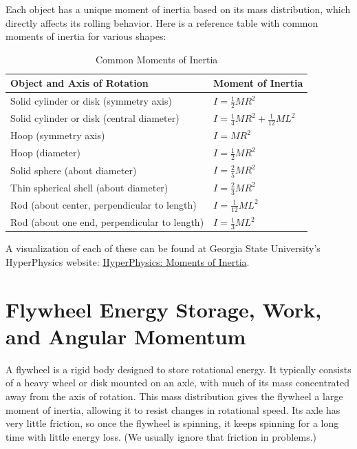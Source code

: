Each object has a unique moment of inertia based on its mass distribution, which directly affects its rolling behavior. Here is a reference table with common moments of inertia for various shapes:
\begin{table}[H]
  \centering
  \renewcommand{\arraystretch}{1.5}
  \begin{tabular}{|l|l|}
    \hline
    \textbf{Object and Axis of Rotation} & \textbf{Moment of Inertia} \\
    \hline
    Solid cylinder or disk (symmetry axis) & $I = \tfrac{1}{2}MR^2$ \\
    \hline
    Solid cylinder or disk (central diameter) & $I = \tfrac{1}{4}MR^2 + \tfrac{1}{12}ML^2$ \\
    \hline
    Hoop (symmetry axis) & $I = MR^2$ \\
    \hline
    Hoop (diameter) & $I = \tfrac{1}{2}MR^2$ \\
    \hline
    Solid sphere (about diameter) & $I = \tfrac{2}{5}MR^2$ \\
    \hline
    Thin spherical shell (about diameter) & $I = \tfrac{2}{3}MR^2$ \\
    \hline
    Rod (about center, perpendicular to length) & $I = \tfrac{1}{12}ML^2$ \\
    \hline
    Rod (about one end, perpendicular to length) & $I = \tfrac{1}{3}ML^2$ \\
    \hline
  \end{tabular}
  \caption{Common Moments of Inertia}
  \label{tab:moments_of_inertia}
\end{table}
A visualization of each of these can be found at Georgia State University's HyperPhysics website: \href{http://hyperphysics.phy-astr.gsu.edu/hbase/mi.html#cmi}{HyperPhysics: Moments of Inertia}.

\section{Flywheel Energy Storage, Work, and Angular Momentum}
A flywheel is a rigid body designed to store rotational energy. It typically consists of a heavy wheel or disk mounted on an axle, with much of its mass concentrated away from the axis of rotation. This mass distribution gives the flywheel a large moment of inertia, allowing it to resist changes in rotational speed. Its axle has very little friction, so once the flywheel is spinning, it
keeps spinning for a long time with little energy loss. (We usually ignore
that friction in problems.)

